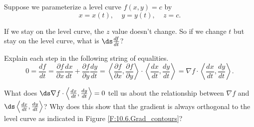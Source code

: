 \begin{activity} \label{A:10.6.5} Suppose we parameterize a level curve $f(x, y) = c$ by
\[x = x(t), \ \ \ \ \  y = y(t), \ \ \ \ \ z = c.\]
    \ba
    \item If we stay on the level curve, the $z$ value doesn't change. So if we change $t$ but stay on the level curve, what is $\ds \frac{df}{dt}$?

    \item Explain each step in the following string of equalities.
\[0 = \frac{df}{dt} = \frac{\partial f}{\partial x} \frac{dx}{dt} + \frac{\partial f}{\partial y} \frac{dy}{dt} = \left\langle \frac{\partial f}{\partial x}, \frac{\partial f}{\partial y} \right\rangle \cdot  \left\langle \frac{dx}{dt}, \frac{dy}{dt} \right\rangle = \nabla f \cdot \left\langle \frac{dx}{dt}, \frac{dy}{dt} \right\rangle.\]


    \item What does $\ds \nabla f \cdot \left\langle \frac{dx}{dt}, \frac{dy}{dt} \right\rangle = 0$ tell us about the relationship between $\nabla f$ and $\ds \left\langle \frac{dx}{dt}, \frac{dy}{dt} \right\rangle$? Why does this show that the gradient is always orthogonal to the level curve as indicated in Figure \ref{F:10.6.Grad_contours}?


    \ea



\end{activity}
\begin{smallhint}

\end{smallhint}
\begin{bighint}

\end{bighint}
